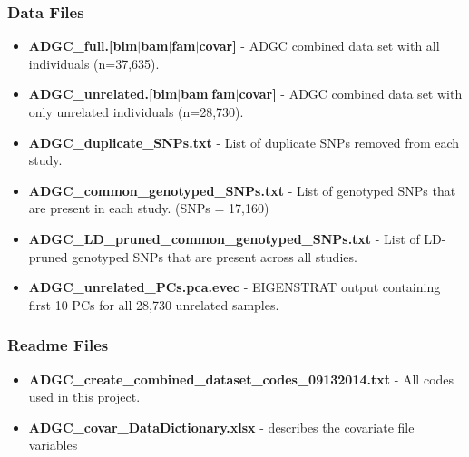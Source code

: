 \documentclass[12pt]{article}
\begin{document}
\subsubsection{Data Files}

\begin{itemize}
\item \textbf{ADGC\_full.[bim$|$bam$|$fam$|$covar]} - ADGC combined data set with all individuals (n=37,635).

\item \textbf{ADGC\_unrelated.[bim$|$bam$|$fam$|$covar]} - ADGC combined data set with only unrelated individuals (n=28,730).

\item \textbf{ADGC\_duplicate\_SNPs.txt} - List of duplicate SNPs removed from each study.

\item \textbf{ADGC\_common\_genotyped\_SNPs.txt} - List of genotyped SNPs that are present in each study. (SNPs = 17,160)

\item \textbf{ADGC\_LD\_pruned\_common\_genotyped\_SNPs.txt} - List of LD-pruned genotyped SNPs that are present across all studies.

\item \textbf{ADGC\_unrelated\_PCs.pca.evec} - EIGENSTRAT output containing first 10 PCs for all 28,730 unrelated samples.

\end{itemize}

\subsubsection{Readme Files}

\begin{itemize}

\item \textbf{ADGC\_create\_combined\_dataset\_codes\_09132014.txt} - All codes used in this project.

\item \textbf{ADGC\_covar\_DataDictionary.xlsx} - describes the covariate file variables

\end{itemize}
\end{document}
